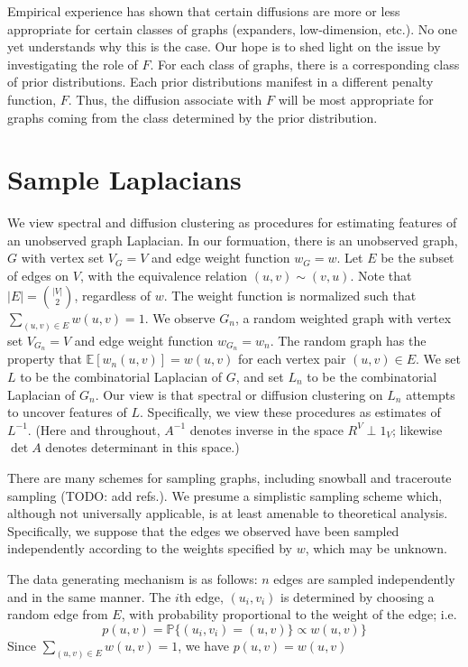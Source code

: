 \documentclass{article}
\newcommand{\prob}{\mathbb{P}}
\newcommand{\E}{\mathbb{E}}
\begin{document}
Empirical experience has shown that certain diffusions are more or less appropriate for certain classes of graphs (expanders, low-dimension, etc.).  No one yet understands why this is the case.  Our hope is to shed light on the issue by investigating the role of $F$.  For each class of graphs, there is a corresponding class of prior distributions.  Each prior distributions manifest in a different penalty function, $F$.  Thus, the diffusion associate with $F$ will be most appropriate for graphs coming from the class determined by the prior distribution.


\section{Sample Laplacians}

We view spectral and diffusion clustering as procedures for estimating
features of an unobserved graph Laplacian.  In our formuation, there
is an unobserved graph, $G$ with vertex set $V_G = V$ and edge weight
function $w_G = w$.  Let $E$ be the subset of edges on $V$, with the
equivalence relation $(u,v) \sim (v,u)$.  Note that $|E| =
\binom{|V|}{2}$, regardless of $w$.  The weight function is normalized such that
$\sum_{(u,v) \in E} w(u,v) = 1$.  We observe $G_n$, a random weighted graph with
vertex set $V_{G_n} = V$ and edge weight function $w_{G_n} = w_n$.
The random graph has the property that $\E[w_n(u,v)] = w(u,v)$ for
each vertex pair $(u,v) \in E$.  We set $L$ to be the combinatorial
Laplacian of $G$, and set $L_n$ to be the combinatorial Laplacian of
$G_n$.  Our view is that spectral or diffusion clustering on $L_n$
attempts to uncover features of $L$.  Specifically, we view these
procedures as estimates of $L^{-1}$.  (Here and throughout, $A^{-1}$
denotes inverse in the space $R^V \perp 1_V$; likewise $\det A$
denotes determinant in this space.)

There are many schemes for sampling graphs, including snowball and
traceroute sampling (TODO: add refs.). We presume a simplistic
sampling scheme which, although not universally applicable, is at
least amenable to theoretical analysis.  Specifically, we suppose that
the edges we observed have been sampled independently according to the
weights specified by $w$, which may be unknown.

The data generating mechanism is as follows: $n$ edges are sampled
independently and in the same manner.  The $i$th edge, $(u_i, v_i)$ is determined by
choosing a random edge from $E$, with probability proportional to the
weight of the edge; i.e.
\[
p(u,v) = \prob\{ (u_i,v_i) = (u,v) \} \propto w(u,v) \}
\]
Since $\sum_{(u,v) \in E} w(u,v) = 1$, we have
\(
  p(u,v) = w(u,v)
\)
\end{document}
